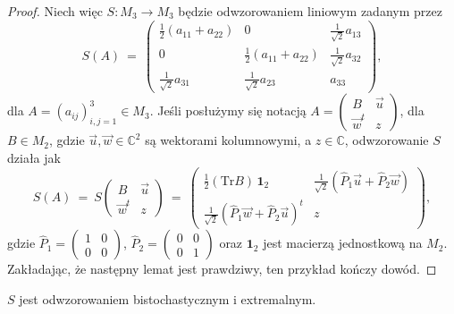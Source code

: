 \begin{proof}
Niech więc $S\!: M_{3} \rightarrow M_{3}$ będzie odwzorowaniem liniowym
zadanym przez
\begin{equation}
\label{eq:DefinitionOfS}
S(A) \:=\: \begin{pmatrix}
        \frac{1}{2}(a_{11} + a_{22}) & 0 & \frac{1}{\sqrt{2}} a_{13} \\
        0 & \frac{1}{2}(a_{11} + a_{22}) & \frac{1}{\sqrt{2}} a_{32} \\
        \frac{1}{\sqrt{2}} a_{31} & \frac{1}{\sqrt{2}} a_{23} & a_{33}
        \end{pmatrix},
\end{equation}
dla
$A = \left( a_{ij} \right)_{i,j=1}^{3}
        \in M_{3}$.
Jeśli posłużymy się notacją
$A = \left( \begin{smallmatrix}
    B & \vec{u} \\
    \vec{w}^{t} & z
    \end{smallmatrix} \right)$,
dla $B \in M_{2}$, gdzie
$\vec{u},\vec{w} \in \mathbb{C}^{2}$ są wektorami kolumnowymi,
a $z \in \mathbb{C}$,
odwzorowanie $S$ działa jak
\begin{equation}
    S(A) \:=\: S \begin{pmatrix}
    B & \vec{u} \\
    \vec{w}^{t} & z
    \end{pmatrix} \: = \:
    \begin{pmatrix}
        \frac{1}{2} (\text{Tr} B) \, \mathbf{1}_{2} &
            \frac{1}{\sqrt{2}}(\hat{P}_{1} \vec{u} + \hat{P}_{2} \vec{w}) \\
        \frac{1}{\sqrt{2}}(\hat{P}_{1} \vec{w} + \hat{P}_{2} \vec{u})^{t} & z
    \end{pmatrix},
\end{equation}
gdzie
$\hat{P}_{1} = \left( \begin{smallmatrix} 1 & 0 \\ 0 & 0 \end{smallmatrix} \right)$,
$\hat{P}_{2} = \left( \begin{smallmatrix} 0 & 0 \\ 0 & 1 \end{smallmatrix} \right)$
oraz $\mathbf{1}_{2}$ jest macierzą jednostkową na $M_{2}$.
Zakładając, że następny lemat jest prawdziwy,
ten przykład kończy dowód.
\end{proof}


\begin{Lemma}
\label{lem:SIsExtremal}
$S$ jest odwzorowaniem bistochastycznym i extremalnym.
\end{Lemma}

